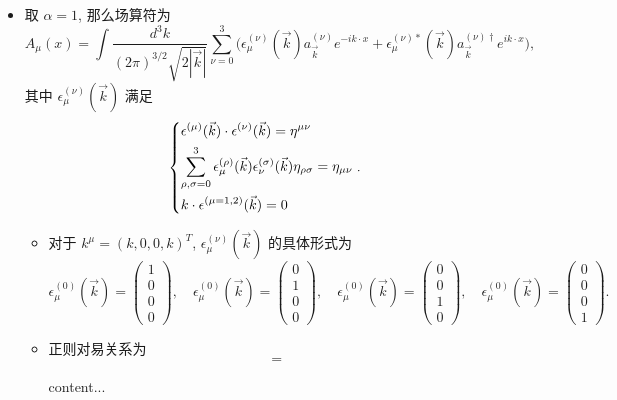 \begin{itemize}
	\item 取 $\alpha = 1$, 那么场算符为
	\begin{equation}
		A_\mu(x) = \int \frac{d^3 k}{(2 \pi)^{3 / 2} \sqrt{2 |\vec{k}|}} \sum_{\nu = 0}^3 \Big( \epsilon^{(\nu)}_\mu(\vec{k}) a^{(\nu)}_{\vec{k}} e^{- i k \cdot x} + \epsilon^{(\nu) *}_\mu(\vec{k}) a^{(\nu) \dag}_{\vec{k}} e^{i k \cdot x} \Big),
	\end{equation}
	其中 $\epsilon^{(\nu)}_\mu(\vec{k})$ 满足
	\begin{equation}
		\begin{dcases}
			\epsilon^{(\mu)}(\vec{k}) \cdot \epsilon^{(\nu)}(\vec{k}) = \eta^{\mu \nu} \\
			\sum_{\rho, \sigma = 0}^3 \epsilon^{(\rho)}_\mu(\vec{k}) \epsilon^{(\sigma)}_\nu(\vec{k}) \eta_{\rho \sigma} = \eta_{\mu \nu} \\
			k \cdot \epsilon^{(\mu = 1, 2)}(\vec{k}) = 0
		\end{dcases}.
	\end{equation}
	\begin{itemize}
		\item 对于 $k^\mu = (k, 0, 0, k)^T$, $\epsilon^{(\nu)}_\mu(\vec{k})$ 的具体形式为
		\begin{equation}
			\epsilon^{(0)}_\mu(\vec{k}) = \begin{pmatrix}
				1 \\
				0 \\
				0 \\
				0
			\end{pmatrix}, \quad \epsilon^{(0)}_\mu(\vec{k}) = \begin{pmatrix}
				0 \\
				1 \\
				0 \\
				0
			\end{pmatrix}, \quad \epsilon^{(0)}_\mu(\vec{k}) = \begin{pmatrix}
				0 \\
				0 \\
				1 \\
				0
			\end{pmatrix}, \quad \epsilon^{(0)}_\mu(\vec{k}) = \begin{pmatrix}
				0 \\
				0 \\
				0 \\
				1
			\end{pmatrix}.
		\end{equation}
		
		\item 正则对易关系为
		\begin{equation}
			[\pi_\mu(t, \vec{x}), A_\nu(t, \vec{y})] = 
		\end{equation}
		
		\begin{tcolorbox}[title=calculation:]
			content...
		\end{tcolorbox}
	\end{itemize}
\end{itemize}
